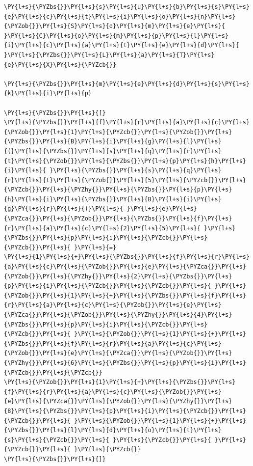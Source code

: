 \begin{tcolorbox}[breakable, size=fbox, boxrule=1pt, pad at break*=1mm,colback=cellbackground, colframe=cellborder]
\begin{Verbatim}[commandchars=\\\{\}]
\PY{l+s}{\PYZbs{}}\PY{l+s}{s}\PY{l+s}{u}\PY{l+s}{b}\PY{l+s}{s}\PY{l+s}{e}\PY{l+s}{c}\PY{l+s}{t}\PY{l+s}{i}\PY{l+s}{o}\PY{l+s}{n}\PY{l+s}{\PYZob{}}\PY{l+s}{S}\PY{l+s}{o}\PY{l+s}{m}\PY{l+s}{e}\PY{l+s}{ }\PY{l+s}{C}\PY{l+s}{o}\PY{l+s}{m}\PY{l+s}{p}\PY{l+s}{l}\PY{l+s}{i}\PY{l+s}{c}\PY{l+s}{a}\PY{l+s}{t}\PY{l+s}{e}\PY{l+s}{d}\PY{l+s}{ }\PY{l+s}{\PYZbs{}}\PY{l+s}{L}\PY{l+s}{a}\PY{l+s}{T}\PY{l+s}{e}\PY{l+s}{X}\PY{l+s}{\PYZcb{}}

\PY{l+s}{\PYZbs{}}\PY{l+s}{m}\PY{l+s}{e}\PY{l+s}{d}\PY{l+s}{s}\PY{l+s}{k}\PY{l+s}{i}\PY{l+s}{p}

\PY{l+s}{\PYZbs{}}\PY{l+s}{[}
\PY{l+s}{\PYZbs{}}\PY{l+s}{f}\PY{l+s}{r}\PY{l+s}{a}\PY{l+s}{c}\PY{l+s}{\PYZob{}}\PY{l+s}{1}\PY{l+s}{\PYZcb{}}\PY{l+s}{\PYZob{}}\PY{l+s}{\PYZbs{}}\PY{l+s}{B}\PY{l+s}{i}\PY{l+s}{g}\PY{l+s}{l}\PY{l+s}{(}\PY{l+s}{\PYZbs{}}\PY{l+s}{s}\PY{l+s}{q}\PY{l+s}{r}\PY{l+s}{t}\PY{l+s}{\PYZob{}}\PY{l+s}{\PYZbs{}}\PY{l+s}{p}\PY{l+s}{h}\PY{l+s}{i}\PY{l+s}{ }\PY{l+s}{\PYZbs{}}\PY{l+s}{s}\PY{l+s}{q}\PY{l+s}{r}\PY{l+s}{t}\PY{l+s}{\PYZob{}}\PY{l+s}{5}\PY{l+s}{\PYZcb{}}\PY{l+s}{\PYZcb{}}\PY{l+s}{\PYZhy{}}\PY{l+s}{\PYZbs{}}\PY{l+s}{p}\PY{l+s}{h}\PY{l+s}{i}\PY{l+s}{\PYZbs{}}\PY{l+s}{B}\PY{l+s}{i}\PY{l+s}{g}\PY{l+s}{r}\PY{l+s}{)}\PY{l+s}{ }\PY{l+s}{e}\PY{l+s}{\PYZca{}}\PY{l+s}{\PYZob{}}\PY{l+s}{\PYZbs{}}\PY{l+s}{f}\PY{l+s}{r}\PY{l+s}{a}\PY{l+s}{c}\PY{l+s}{2}\PY{l+s}{5}\PY{l+s}{ }\PY{l+s}{\PYZbs{}}\PY{l+s}{p}\PY{l+s}{i}\PY{l+s}{\PYZcb{}}\PY{l+s}{\PYZcb{}}\PY{l+s}{ }\PY{l+s}{=}
\PY{l+s}{1}\PY{l+s}{+}\PY{l+s}{\PYZbs{}}\PY{l+s}{f}\PY{l+s}{r}\PY{l+s}{a}\PY{l+s}{c}\PY{l+s}{\PYZob{}}\PY{l+s}{e}\PY{l+s}{\PYZca{}}\PY{l+s}{\PYZob{}}\PY{l+s}{\PYZhy{}}\PY{l+s}{2}\PY{l+s}{\PYZbs{}}\PY{l+s}{p}\PY{l+s}{i}\PY{l+s}{\PYZcb{}}\PY{l+s}{\PYZcb{}}\PY{l+s}{ }\PY{l+s}{\PYZob{}}\PY{l+s}{1}\PY{l+s}{+}\PY{l+s}{\PYZbs{}}\PY{l+s}{f}\PY{l+s}{r}\PY{l+s}{a}\PY{l+s}{c}\PY{l+s}{\PYZob{}}\PY{l+s}{e}\PY{l+s}{\PYZca{}}\PY{l+s}{\PYZob{}}\PY{l+s}{\PYZhy{}}\PY{l+s}{4}\PY{l+s}{\PYZbs{}}\PY{l+s}{p}\PY{l+s}{i}\PY{l+s}{\PYZcb{}}\PY{l+s}{\PYZcb{}}\PY{l+s}{ }\PY{l+s}{\PYZob{}}\PY{l+s}{1}\PY{l+s}{+}\PY{l+s}{\PYZbs{}}\PY{l+s}{f}\PY{l+s}{r}\PY{l+s}{a}\PY{l+s}{c}\PY{l+s}{\PYZob{}}\PY{l+s}{e}\PY{l+s}{\PYZca{}}\PY{l+s}{\PYZob{}}\PY{l+s}{\PYZhy{}}\PY{l+s}{6}\PY{l+s}{\PYZbs{}}\PY{l+s}{p}\PY{l+s}{i}\PY{l+s}{\PYZcb{}}\PY{l+s}{\PYZcb{}}
\PY{l+s}{\PYZob{}}\PY{l+s}{1}\PY{l+s}{+}\PY{l+s}{\PYZbs{}}\PY{l+s}{f}\PY{l+s}{r}\PY{l+s}{a}\PY{l+s}{c}\PY{l+s}{\PYZob{}}\PY{l+s}{e}\PY{l+s}{\PYZca{}}\PY{l+s}{\PYZob{}}\PY{l+s}{\PYZhy{}}\PY{l+s}{8}\PY{l+s}{\PYZbs{}}\PY{l+s}{p}\PY{l+s}{i}\PY{l+s}{\PYZcb{}}\PY{l+s}{\PYZcb{}}\PY{l+s}{ }\PY{l+s}{\PYZob{}}\PY{l+s}{1}\PY{l+s}{+}\PY{l+s}{\PYZbs{}}\PY{l+s}{l}\PY{l+s}{d}\PY{l+s}{o}\PY{l+s}{t}\PY{l+s}{s}\PY{l+s}{\PYZcb{}}\PY{l+s}{ }\PY{l+s}{\PYZcb{}}\PY{l+s}{ }\PY{l+s}{\PYZcb{}}\PY{l+s}{ }\PY{l+s}{\PYZcb{}}
\PY{l+s}{\PYZbs{}}\PY{l+s}{]}


\end{Verbatim}
\end{tcolorbox}
